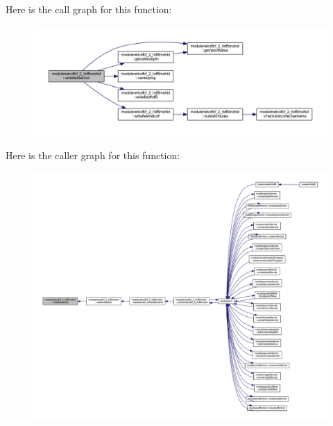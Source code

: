Here is the call graph for this function\+:\nopagebreak
\begin{figure}[H]
\begin{center}
\leavevmode
\includegraphics[width=350pt]{namespacemodulenetcdfcf__2__hdf5mohid_af0d01522f1a028b5bded5653f028f1de_cgraph}
\end{center}
\end{figure}
Here is the caller graph for this function\+:\nopagebreak
\begin{figure}[H]
\begin{center}
\leavevmode
\includegraphics[width=350pt]{namespacemodulenetcdfcf__2__hdf5mohid_af0d01522f1a028b5bded5653f028f1de_icgraph}
\end{center}
\end{figure}
\mbox{\label{namespacemodulenetcdfcf__2__hdf5mohid_a9a0ad1eb97650a07ad08d1d3d20271ad}} 
